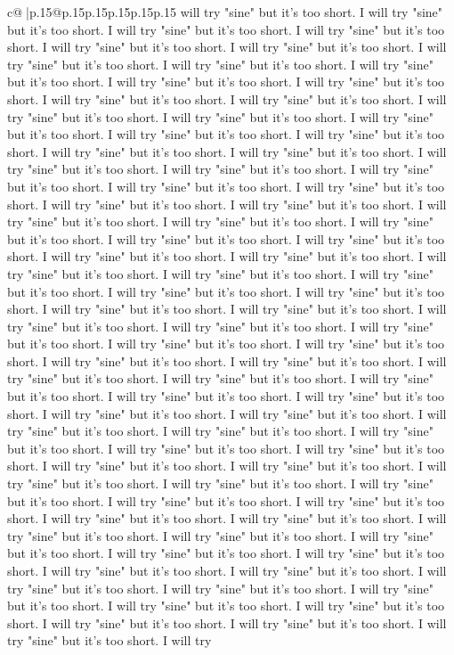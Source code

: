 \documentclass{article}
\begin{document}
{\begin{supertabular}{c@{$\;$}|p{.15\linewidth}@{}p{.15\linewidth}p{.15\linewidth}p{.15\linewidth}p{.15\linewidth}p{.15\linewidth}}
{{{will try "sine" but it's too short. I will try "sine" but it's too short. I will try "sine" but it's too short. I will try "sine" but it's too short. I will try "sine" but it's too short. I will try "sine" but it's too short. I will try "sine" but it's too short. I will try "sine" but it's too short. I will try "sine" but it's too short. I will try "sine" but it's too short. I will try "sine" but it's too short. I will try "sine" but it's too short. I will try "sine" but it's too short. I will try "sine" but it's too short. I will try "sine" but it's too short. I will try "sine" but it's too short. I will try "sine" but it's too short. I will try "sine" but it's too short. I will try "sine" but it's too short. I will try "sine" but it's too short. I will try "sine" but it's too short. I will try "sine" but it's too short. I will try "sine" but it's too short. I will try "sine" but it's too short. I will try "sine" but it's too short. I will try "sine" but it's too short. I will try "sine" but it's too short. I will try "sine" but it's too short. I will try "sine" but it's too short. I will try "sine" but it's too short. I will try "sine" but it's too short. I will try "sine" but it's too short. I will try "sine" but it's too short. I will try "sine" but it's too short. I will try "sine" but it's too short. I will try "sine" but it's too short. I will try "sine" but it's too short. I will try "sine" but it's too short. I will try "sine" but it's too short. I will try "sine" but it's too short. I will try "sine" but it's too short. I will try "sine" but it's too short. I will try "sine" but it's too short. I will try "sine" but it's too short. I will try "sine" but it's too short. I will try "sine" but it's too short. I will try "sine" but it's too short. I will try "sine" but it's too short. I will try "sine" but it's too short. I will try "sine" but it's too short. I will try "sine" but it's too short. I will try "sine" but it's too short. I will try "sine" but it's too short. I will try "sine" but it's too short. I will try "sine" but it's too short. I will try "sine" but it's too short. I will try "sine" but it's too short. I will try "sine" but it's too short. I will try "sine" but it's too short. I will try "sine" but it's too short. I will try "sine" but it's too short. I will try "sine" but it's too short. I will try "sine" but it's too short. I will try "sine" but it's too short. I will try "sine" but it's too short. I will try "sine" but it's too short. I will try "sine" but it's too short. I will try "sine" but it's too short. I will try "sine" but it's too short. I will try "sine" but it's too short. I will try "sine" but it's too short. I will try "sine" but it's too short. I will try "sine" but it's too short. I will try "sine" but it's too short. I will try "sine" but it's too short. I will try "sine" but it's too short. I will try "sine" but it's too short. I will try "sine" but it's too short. I will try "sine" but it's too short. I will try "sine" but it's too short. I will try "sine" but it's too short. I will try "sine" but it's too short. I will try "sine" but it's too short. I will try "sine" but it's too short. I will try }}}
\end{supertabular}}
\end{document}
